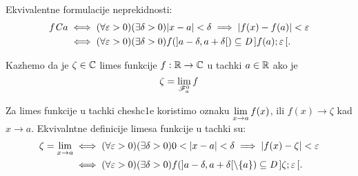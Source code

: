 \documentclass[../main_og.tex]{subfiles}
\begin{document}
    Ekvivalentne formulacije neprekidnosti: 
    \begin{align*}
        f \mathit{C} a &\iff (\forall \varepsilon> 0)(\exists \delta > 0) |x-a|<\delta \implies |f(x)-f(a)|<\varepsilon \\
                  &\iff (\forall \varepsilon> 0)(\exists \delta > 0) f(]a-\delta,a+\delta[)\subseteq \mathit{D}\,]f(a);\varepsilon\,[.
    \end{align*}

    \begin{de}\label{deflimfje}
    Kazhemo da je $\zeta \in \mathbb{C}$ limes funkcije $f:\mathbb{R}\to\mathbb{C}$ u tachki $a\in\mathbb{R}$ ako je $$\zeta=\displaystyle{\lim_{\mathscr{F}_a^0}f}$$
        \end{de}
    Za limes funkcije u tachki chesh\-c1e koristimo oznaku $\displaystyle{\lim_{x \to a}f(x)}$, ili $f(x)\to \zeta$ kad $x\to a$. Ekvivalntne definicije limesa funkcije u tachki su: 
    \begin{align*}
        \zeta= \lim_{x\to a} &\iff(\forall \eps> 0)(\exists \delta > 0) 0<|x-a|<\delta \implies |f(x)-\zeta|<\eps\\
                             &\iff(\forall \eps> 0)(\exists \delta > 0) f(]a-\delta,a+\delta[\setminus \{a\})\psj \od{\zeta}{\eps}.
    \end{align*}
\end{document}
